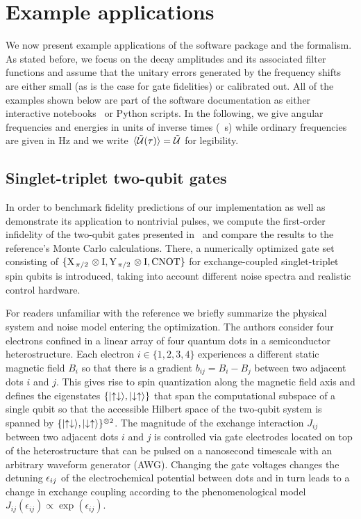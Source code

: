\chapter{Example applications}\label{ch:ff:examples}
We now present example applications of the software package and the formalism.
As stated before, we focus on the decay amplitudes \decayamps and its associated filter functions and assume that the unitary errors generated by the frequency shifts \freqshifts are either small (as is the case for gate fidelities) or calibrated out.
All of the examples shown below are part of the software documentation as either interactive \jupyter notebooks~\cite{Kluyver2016} or Python scripts.
In the following, we give angular frequencies and energies in units of inverse times (\eg \si{\per\second}) while ordinary frequencies are given in \si{\hertz} and we write $\ev*{\liouvUe(\tau)} = \liouvUe$ for legibility.

\section{Singlet-triplet two-qubit gates}\label{sec:ff:examples:optimized_gates}
In order to benchmark fidelity predictions of our implementation as well as demonstrate its application to nontrivial pulses, we compute the first-order infidelity of the two-qubit gates presented in~ and compare the results to the reference's Monte Carlo calculations.
There, a numerically optimized gate set consisting of $\lbrace\XID2,\YID2,\CNOT\rbrace$ for exchange-coupled singlet-triplet spin qubits is introduced, taking into account different noise spectra and realistic control hardware.

For readers unfamiliar with the reference we briefly summarize the physical system and noise model entering the optimization.
The authors consider four electrons confined in a linear array of four quantum dots in a semiconductor heterostructure.
Each electron $i\in\lbrace 1,2,3,4\rbrace$ experiences a different static magnetic field $B_i$ so that there is a gradient $b_{ij} = B_i - B_j$ between two adjacent dots $i$ and $j$.
This gives rise to spin quantization along the magnetic field axis and defines the eigenstates $\lbrace\mbox{\ensuremath{\ket{\uparrow\downarrow}}},\mbox{\ensuremath{\ket{\downarrow\uparrow}}}\rbrace$ that span the computational subspace of a single qubit so that the accessible Hilbert space of the two-qubit system is spanned by $\lbrace\mbox{\ensuremath{\ket{\uparrow\downarrow}}},\mbox{\ensuremath{\ket{\downarrow\uparrow}}}\rbrace^{\otimes 2}$.
The magnitude of the exchange interaction $J_{ij}$ between two adjacent dots $i$ and $j$ is controlled via gate electrodes located on top of the heterostructure that can be pulsed on a nanosecond timescale with an arbitrary waveform generator (AWG).
Changing the gate voltages changes the detuning $\epsilon_{ij}$ of the electrochemical potential between dots and in turn leads to a change in exchange coupling according to the phenomenological model $J_{ij}(\epsilon_{ij})\propto\exp(\epsilon_{ij})$.

